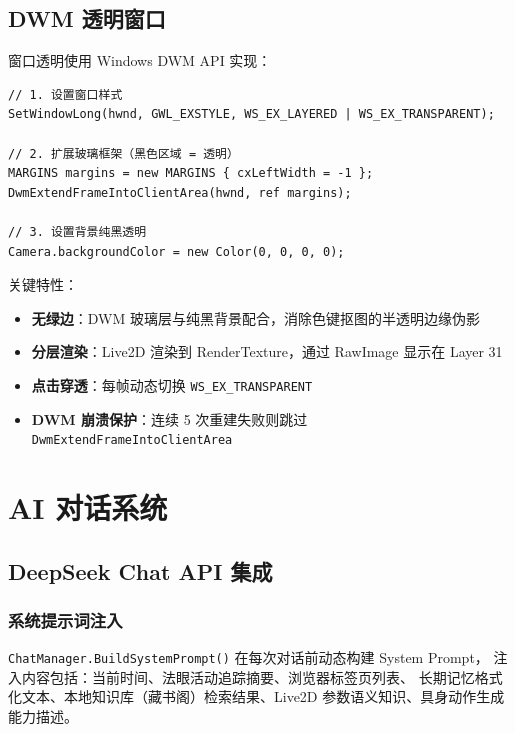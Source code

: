 \documentclass[12pt,a4paper]{ctexart}
\begin{document}
\subsection{DWM 透明窗口}

窗口透明使用 Windows DWM API 实现：

\begin{lstlisting}[style=csharp,caption={DWM 玻璃层扩展},label={lst:dwm}]
// 1. 设置窗口样式
SetWindowLong(hwnd, GWL_EXSTYLE, WS_EX_LAYERED | WS_EX_TRANSPARENT);

// 2. 扩展玻璃框架（黑色区域 = 透明）
MARGINS margins = new MARGINS { cxLeftWidth = -1 };
DwmExtendFrameIntoClientArea(hwnd, ref margins);

// 3. 设置背景纯黑透明
Camera.backgroundColor = new Color(0, 0, 0, 0);
\end{lstlisting}

关键特性：
\begin{itemize}
    \item \textbf{无绿边}：DWM 玻璃层与纯黑背景配合，消除色键抠图的半透明边缘伪影
    \item \textbf{分层渲染}：Live2D 渲染到 RenderTexture，通过 RawImage 显示在 Layer 31
    \item \textbf{点击穿透}：每帧动态切换 \texttt{WS\_EX\_TRANSPARENT}
    \item \textbf{DWM 崩溃保护}：连续 5 次重建失败则跳过 \texttt{DwmExtendFrameIntoClientArea}
\end{itemize}

\section{AI 对话系统}

\subsection{DeepSeek Chat API 集成}

\subsubsection{系统提示词注入}

\texttt{ChatManager.BuildSystemPrompt()} 在每次对话前动态构建 System Prompt，
注入内容包括：当前时间、法眼活动追踪摘要、浏览器标签页列表、
长期记忆格式化文本、本地知识库（藏书阁）检索结果、Live2D 参数语义知识、具身动作生成能力描述。
\end{document}
